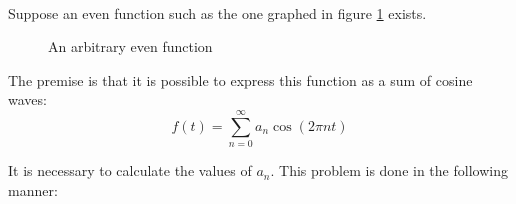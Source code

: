 \documentclass{article}
\begin{document}
\paragraph*{}
Suppose an even function such as the one graphed in figure 
\ref{fig:odd-arb-func} exists.
\begin{figure}[ht]
	\centering
	\caption{An arbitrary even function}
	\label{fig:odd-arb-func}
\end{figure}

The premise is that it is possible to express this function as a sum of cosine 
waves:
$$f(t) = \sum^{\infty}_{n=0}a_n \cos(2 \pi n t)$$

It is necessary to calculate the values of $a_n$. This problem is done in the 
following manner:
\end{document}
